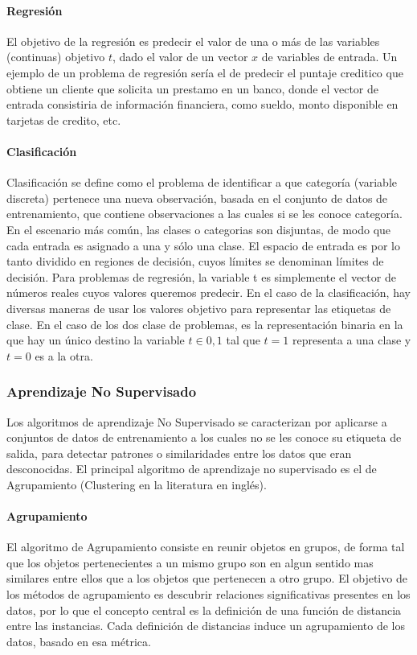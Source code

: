 \documentclass[a4paper,11pt,spanish]{book}
\begin{document}
	\paragraph {Regresión}  
	  El objetivo de la regresión es predecir el valor de una o más de las variables (continuas) objetivo $t$, dado el valor de un vector $x$ de variables de entrada.
	  Un ejemplo de un problema de regresión sería el de predecir el puntaje creditico que obtiene un cliente que solicita un prestamo en un banco, donde el vector de entrada 
	  consistiria de información financiera, como sueldo, monto disponible en tarjetas de credito, etc.
	\paragraph {Clasificación}
	  Clasificación se define como el problema de identificar a que categoría (variable discreta) pertenece una nueva observación, basada en el conjunto de datos de entrenamiento, 
	  que contiene observaciones a las cuales  si se les conoce categoría. En el escenario más común, las clases o categorias son disjuntas, 
	  de modo que cada entrada es asignado a una y sólo una clase. El espacio de entrada es por lo tanto dividido en regiones de decisión, cuyos límites se denominan límites de decisión.
	  Para problemas de regresión, la variable t es simplemente el vector de números reales cuyos valores queremos predecir. En el caso de la clasificación, 
	  hay diversas maneras de usar los valores objetivo para representar las etiquetas de clase. En el caso de los dos clase de problemas, es la representación binaria 
	  en la que hay un único destino la variable $t \in {0, 1}$ tal que $t = 1$ representa a una clase y $t = 0$ es a la otra.
	  
      \subsubsection{Aprendizaje No Supervisado} 
	  Los algoritmos de aprendizaje No Supervisado se caracterizan por aplicarse a conjuntos de datos de entrenamiento a los cuales no se les conoce su etiqueta de salida, 
	  para detectar patrones o similaridades entre los datos que eran desconocidas.
	  El principal algoritmo de aprendizaje no supervisado es el de Agrupamiento (Clustering en la literatura en inglés).
	\paragraph {Agrupamiento}
	   El algoritmo de Agrupamiento consiste en reunir objetos en grupos, de forma tal que los objetos pertenecientes a un mismo grupo son en algun sentido mas similares 
	   entre ellos que a los objetos que pertenecen a otro grupo. El objetivo de los métodos de agrupamiento es descubrir relaciones significativas presentes en los datos, por lo
	   que el concepto central es la definición de una función de distancia entre las instancias. Cada definición de distancias induce un agrupamiento de los datos, basado en esa métrica.
\end{document}
